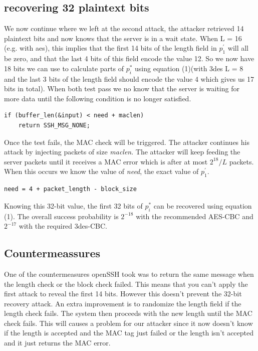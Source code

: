 \documentclass[twocolumn]{article}
\begin{document}
\subsection{recovering 32 plaintext bits}
We now continue where we left at the second attack, the attacker retrieved 14 plaintext bits and now knows that the server is in a wait state. When L = 16 (e.g. with aes), this implies that the first 14 bits of the length field in $p^{'}_1$ will all be zero, and that the last 4 bits of this field encode the value 12. So we now have 18 bits we can use to calculate parts of $p^*_i$ using equation (1)(with 3des L = 8 and the last 3 bits of the length field should encode the value 4 which gives us 17 bits in total). When both test pass we no know that the server is waiting for more data until the following condition is no longer satisfied.
\begin{verbatim}
if (buffer_len(&input) < need + maclen)
	return SSH_MSG_NONE;
\end{verbatim}
Once the test fails, the MAC check will be triggered. The attacker continues his attack by injecting packets of size \emph{maclen}. The attacker will keep feeding the server packets until it receives a MAC error which is after at most $2^{18}/L$ packets. When this occurs we know the value of \emph{need}, the exact value of $p_1^{'}$.
\begin{verbatim}
need = 4 + packet_length - block_size
\end{verbatim}
Knowing this 32-bit value, the first 32 bits of $p^*_i$ can be recovered using equation (1).
The overall success probability is $2^{-18}$ with the recommended AES-CBC and $2^{-17}$ with the required 3des-CBC.
\subsection{Countermeassures}
One of the countermeasures openSSH took was to return the same message when the length check or the block check failed. This means that you can't apply the first attack to reveal the first 14 bits. However this doesn't prevent the 32-bit recovery attack. An extra improvement is to randomize the length field if the length check fails. The system then proceeds with the new length until the MAC check fails. This will causes a problem for our attacker since it now doesn't know if the length is accepted and the MAC tag just failed or the length isn't accepted and it just returns the MAC error.


\end{document}
